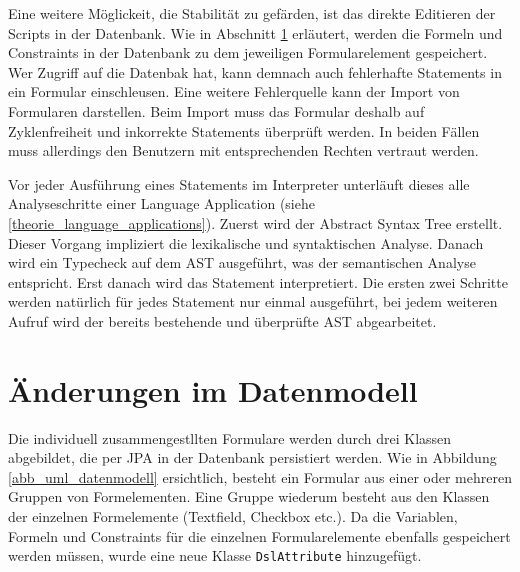 Eine weitere Möglickeit, die Stabilität zu gefärden, ist das direkte Editieren der Scripts in der Datenbank. Wie in Abschnitt \ref{implementierung_datenmodell} erläutert, werden die Formeln und Constraints in der Datenbank zu dem jeweiligen Formularelement gespeichert. Wer Zugriff auf die Datenbak hat, kann demnach auch fehlerhafte Statements in ein Formular einschleusen. Eine weitere Fehlerquelle kann der Import von Formularen darstellen. Beim Import muss das Formular deshalb auf Zyklenfreiheit und inkorrekte Statements überprüft werden. In beiden Fällen muss allerdings den Benutzern mit entsprechenden Rechten vertraut werden.


Vor jeder Ausführung eines Statements im Interpreter unterläuft dieses alle Analyseschritte einer Language Application (siehe \ref{theorie_language_applications}). Zuerst wird der Abstract Syntax Tree erstellt. Dieser Vorgang impliziert die lexikalische und syntaktischen Analyse. Danach wird ein Typecheck auf dem AST ausgeführt, was der semantischen Analyse entspricht. Erst danach wird das Statement interpretiert. Die ersten zwei Schritte werden natürlich für jedes Statement nur einmal ausgeführt, bei jedem weiteren Aufruf wird der bereits bestehende und überprüfte AST abgearbeitet. 




\section{Än\-der\-ung\-en im Datenmodell}
\label{implementierung_datenmodell}

Die individuell zusammengestllten Formulare werden durch drei Klassen abgebildet, die per JPA in der Datenbank persistiert werden. Wie in Abbildung \ref{abb_uml_datenmodell} ersichtlich, besteht ein Formular aus einer oder mehreren Gruppen von Formelementen. Eine Gruppe wiederum besteht aus den Klassen der einzelnen Formelemente (Textfield, Checkbox etc.). Da die Variablen, Formeln und Constraints für die einzelnen Formularelemente ebenfalls ge\-spei\-chert werden müssen, wurde eine neue Klasse \texttt{DslAttribute} hinzugefügt.

